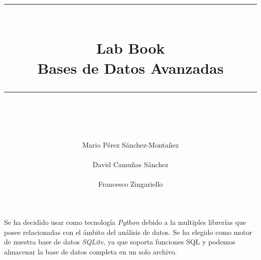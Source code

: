 \documentclass[idxtotoc,hyperref,openany]{labbook} %
\newcommand{\HRule}{\rule{\linewidth}{0.5mm}} %
\begin{document}

\frontmatter %
\title{
\begin{center}
	\centering
\HRule \\[0.4cm]
{\Huge \bfseries Lab Book \\[0.5cm] \Large Bases de Datos Avanzadas}\\[0.4cm] %
\HRule \\[1.5cm]
\end{center}
}
\author{\Huge Mario Pérez Sánchez-Montañez \\ \\ \Huge David Camuñas Sánchez \\ \\ \Huge Francesco Zingariello \\[2cm]} %
\maketitle

\tableofcontents

\mainmatter %









Se ha decidido usar como tecnología \textit{Python} debido a la multiples librerías que posee relacionadas con el ámbito del análisis de datos.
Se ha elegido como motor de nuestra base de datos \textit{SQLite}, ya que soporta funciones SQL y podemos almacenar la base de datos completa en un solo archivo.
\end{document}
